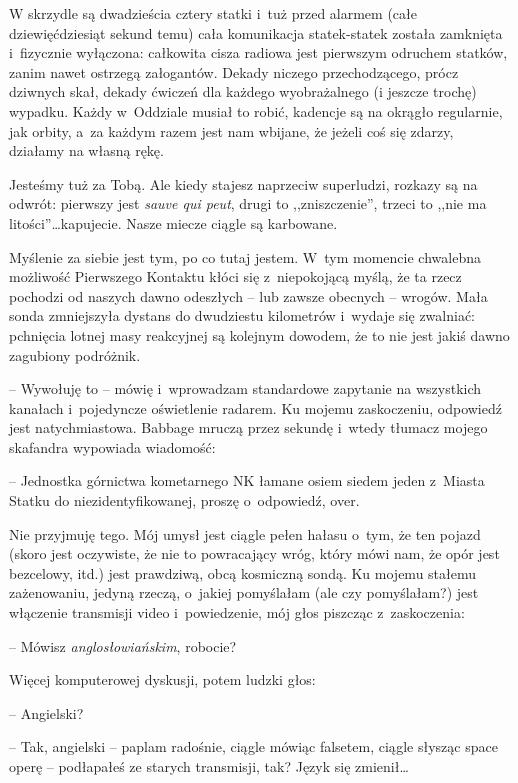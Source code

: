 \documentclass[oneside,polish,11pt,sfheadings]{mwbk}
\let\footnote=\endnote
\begin{document}
W skrzydle są dwadzieścia cztery statki i~tuż przed alarmem (całe
dziewięćdziesiąt sekund temu) cała komunikacja statek-statek została
zamknięta i~fizycznie wyłączona: całkowita cisza radiowa jest pierwszym
odruchem statków, zanim nawet ostrzegą załogantów. Dekady niczego
przechodzącego, prócz dziwnych skał, dekady ćwiczeń dla każdego
wyobrażalnego (i jeszcze trochę) wypadku. Każdy w~Oddziale musiał to
robić, kadencje są na okrągło regularnie, jak orbity, a~za każdym razem
jest nam wbijane, że jeżeli coś się zdarzy, działamy na własną rękę.

Jesteśmy tuż za Tobą. Ale kiedy stajesz naprzeciw superludzi, rozkazy są
na odwrót: pierwszy jest \textit{sauve qui peut}\footnote{ fr. ratuj się kto
może -- przyp.tłum.}, drugi to ,,zniszczenie'', trzeci to ,,nie ma
litości''\ldots  kapujecie. Nasze miecze ciągle są karbowane.

Myślenie za siebie jest tym, po co tutaj jestem. W~tym momencie
chwalebna możliwość Pierwszego Kontaktu kłóci się z~niepokojącą myślą,
że ta rzecz pochodzi od naszych dawno odeszłych -- lub zawsze obecnych -- wrogów. Mała sonda zmniejszyła dystans do dwudziestu kilometrów i~wydaje
się zwalniać: pchnięcia lotnej masy reakcyjnej są kolejnym dowodem, że
to nie jest jakiś dawno zagubiony podróżnik.

-- Wywołuję to -- mówię i~wprowadzam standardowe zapytanie na wszystkich
kanałach i~pojedyncze oświetlenie radarem. Ku mojemu zaskoczeniu,
odpowiedź jest natychmiastowa. Babbage mruczą przez sekundę i~wtedy
tłumacz mojego skafandra wypowiada wiadomość:

-- Jednostka górnictwa kometarnego NK łamane osiem siedem jeden z~Miasta
Statku do niezidentyfikowanej, proszę o~odpowiedź, over.

Nie przyjmuję tego. Mój umysł jest ciągle pełen hałasu o~tym, że ten
pojazd (skoro jest oczywiste, że nie to powracający wróg, który mówi
nam, że opór jest bezcelowy, itd.) jest prawdziwą, obcą kosmiczną sondą.
Ku mojemu stałemu zażenowaniu, jedyną rzeczą, o~jakiej pomyślałam (ale
czy pomyślałam?) jest włączenie transmisji video i~powiedzenie, mój głos
piszcząc z~zaskoczenia:

-- Mówisz \textit{anglosłowiańskim}, robocie?

Więcej komputerowej dyskusji, potem ludzki głos:

-- Angielski?

-- Tak, angielski -- paplam radośnie, ciągle mówiąc falsetem, ciągle
słysząc space operę -- podłapałeś ze starych transmisji, tak? Język się
zmienił\ldots 
\end{document}
